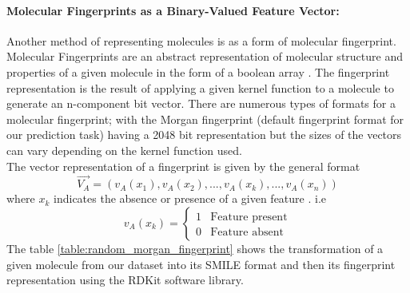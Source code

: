 \documentclass[a4paper,12pt]{report}
\begin{document}
				\paragraph{Molecular Fingerprints as a Binary-Valued Feature Vector:}
				Another method of representing molecules is as a form of molecular fingerprint. Molecular Fingerprints are an abstract representation of molecular structure and properties of a given molecule in the form of a boolean array \cite{Jurgen2004}.
				The fingerprint representation is the result of applying a given kernel function to a molecule to generate an n-component bit vector. There are numerous types of formats for a molecular fingerprint; with the Morgan fingerprint (default fingerprint format for our prediction task) having a 2048 bit representation but the sizes of the vectors can vary depending on the kernel function used. \\
				The vector representation of a fingerprint is given by the general format
					\begin{equation}
						\vec{V_A} = (v_A(x_1), v_A(x_2),...,v_A(x_k),...,v_A(x_n))
					\end{equation}
				where $x_k$ indicates the absence or presence of a given feature \cite{Jurgen2004}. i.e
					\begin{equation}
						v_A(x_k) = 
						\begin{cases}
							1 & \text{Feature present} \\
							0 & \text{Feature absent}
						\end{cases}
					\end{equation}
				The table \ref{table:random_morgan_fingerprint} shows the transformation of a given molecule from our dataset into its SMILE format and then its fingerprint representation using the RDKit software library.
\end{document}
